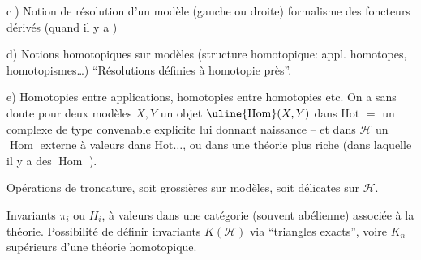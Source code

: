 \textcircled{c)} Notion de résolution d'un modèle (gauche ou droite)
formalisme des foncteurs dérivés (quand il y a
)

d) Notions homotopiques sur modèles (structure
homotopique: appl. homotopes, homotopismes\ldots)
``Résolutions définies à homotopie près''.

e) Homotopies entre applications, homotopies entre
homotopies etc. On a sans doute
 pour deux modèles
$X,Y$ un objet $\uline{\operatorname{Hom}}(X,Y)$ dans $\mathrm{Hot}$
 $=$ un complexe  de type convenable
explicite lui donnant naissance
-- et dans $\mathcal H$ un $\operatorname{Hom}$ externe à valeurs dans
$\mathrm{Hot}\ldots$, ou dans une théorie plus riche
(dans laquelle il y a des $\operatorname{Hom}$ ).

 Opérations de troncature, soit grossières
sur modèles, soit délicates sur $\mathcal H$.

 Invariants $\pi_i$ ou $H_i$, à valeurs dans
une catégorie (souvent abélienne) associée
à la théorie.
 Possibilité de définir  invariants
$K(\mathcal H)$ via ``triangles exacts'', voire $K_n$
supérieurs d'une théorie homotopique.

